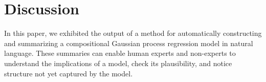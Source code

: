 \documentclass{article} %
\def\eg{e.g.\ }
\begin{document}


\section{Discussion}



In this paper, we exhibited the output of a method for automatically constructing and summarizing a compositional Gaussian process regression model in natural language.
These summaries can enable human experts and non-experts to understand the implications of a model, check its plausibility, and notice structure not yet captured by the model.



\end{document}
